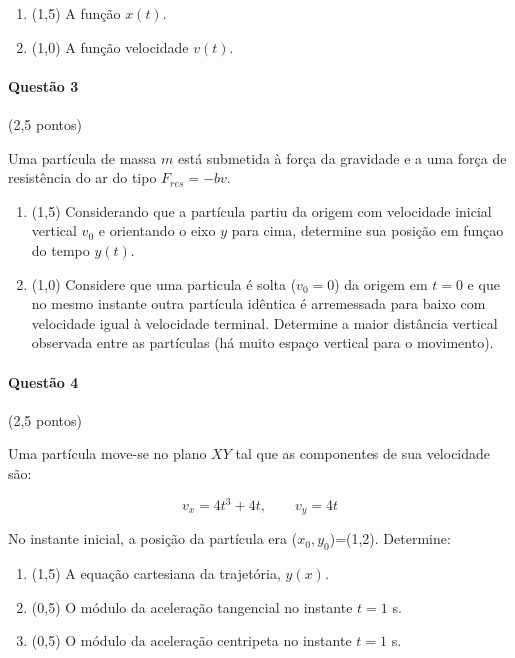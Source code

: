 \documentclass[12pt,a4paper]{article}
\begin{document}
\begin{enumerate}[label=(\alph*)]

\item (1,5) A função $x(t)$.

\item (1,0) A função velocidade $v(t)$.

\end{enumerate}

\paragraph{Questão 3} (2,5 pontos)

Uma partícula de massa $m$ está submetida à força da gravidade e a uma força de resistência do ar do tipo $F_{res}=-bv$.

\begin{enumerate}[label=(\alph*)]

\item (1,5) Considerando que a partícula partiu da origem com velocidade inicial vertical $v_0$ e orientando o eixo $y$ para cima, determine sua posição em funçao do tempo $y(t)$.

\item (1,0) Considere que uma particula é solta ($v_0=0$) da origem em $t=0$ e que no mesmo instante outra partícula idêntica é arremessada para baixo com velocidade igual à velocidade terminal. Determine a maior distância vertical observada entre as partículas (há muito espaço vertical para o movimento).

\end{enumerate}

\paragraph{Questão 4} (2,5 pontos)

Uma partícula move-se no plano $XY$ tal que as componentes de sua velocidade são:

$$v_x=4t^3+4t,\qquad v_y=4t$$

No instante inicial, a posição da partícula era ($x_0,y_0$)=(1,2). Determine:

\begin{enumerate}[label=(\alph*)]

\item (1,5) A equação cartesiana da trajetória, $y(x)$.

\item (0,5) O módulo da aceleração tangencial no instante $t=1$ s.

\item (0,5) O módulo da aceleração centripeta no instante $t=1$ s.

\end{enumerate}
\newpage
\end{document}

